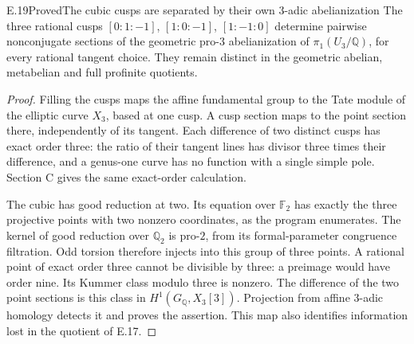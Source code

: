 \begin{statement}{E.19}{Proved}{The cubic cusps are separated by their own 3-adic abelianization}
The three rational cusps $[0:1:-1]$,
$[1:0:-1]$, $[1:-1:0]$ determine pairwise
nonconjugate sections of the geometric
pro-$3$ abelianization of
$\pi_1(U_3/\mathbb Q)$, for every rational
tangent choice. They remain distinct in
the geometric abelian, metabelian and
full profinite quotients.
\end{statement}
\begin{proof}
Filling the cusps maps the affine
fundamental group to the Tate module of
the elliptic curve $X_3$, based at one
cusp. A cusp section maps to the point
section there, independently of its
tangent. Each difference of two distinct
cusps has exact order three: the ratio
of their tangent lines has divisor
three times their difference, and a
genus-one curve has no function with a
single simple pole. Section C gives
the same exact-order calculation.

The cubic has good reduction at two.
Its equation over $\mathbb F_2$ has
exactly the three projective points
with two nonzero coordinates, as the
program enumerates. The kernel of
good reduction over $\mathbb Q_2$ is
pro-$2$, from its formal-parameter
congruence filtration. Odd torsion
therefore injects into this group of
three points. A rational point of
exact order three cannot be divisible
by three: a preimage would have order
nine. Its Kummer class modulo three
is nonzero. The difference of the
two point sections is this class
in $H^1(G_{\mathbb Q},X_3[3])$.
Projection from affine 3-adic homology
detects it and proves the assertion.
This map also identifies information
lost in the quotient of E.17.
\end{proof}

